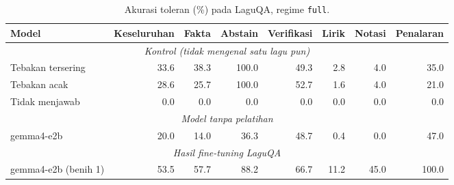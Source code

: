 \begin{table}[t]
\centering
\small
\caption{Akurasi toleran (\%) pada LaguQA, regime \texttt{full}.}
\begin{tabular}{lrrrrrrr}
\toprule
\textbf{Model} & \textbf{Keseluruhan} & \textbf{Fakta} & \textbf{Abstain} & \textbf{Verifikasi} & \textbf{Lirik} & \textbf{Notasi} & \textbf{Penalaran} \\
\midrule
\multicolumn{8}{c}{\textit{Kontrol (tidak mengenal satu lagu pun)}} \\
Tebakan tersering & 33.6 & 38.3 & 100.0 & 49.3 & 2.8 & 4.0 & 35.0 \\
Tebakan acak & 28.6 & 25.7 & 100.0 & 52.7 & 1.6 & 4.0 & 21.0 \\
Tidak menjawab & 0.0 & 0.0 & 0.0 & 0.0 & 0.0 & 0.0 & 0.0 \\
\midrule
\multicolumn{8}{c}{\textit{Model tanpa pelatihan}} \\
gemma4-e2b & 20.0 & 14.0 & 36.3 & 48.7 & 0.4 & 0.0 & 47.0 \\
\midrule
\multicolumn{8}{c}{\textit{Hasil fine-tuning LaguQA}} \\
gemma4-e2b (benih 1) & 53.5 & 57.7 & 88.2 & 66.7 & 11.2 & 45.0 & 100.0 \\
\bottomrule
\end{tabular}
\end{table}
